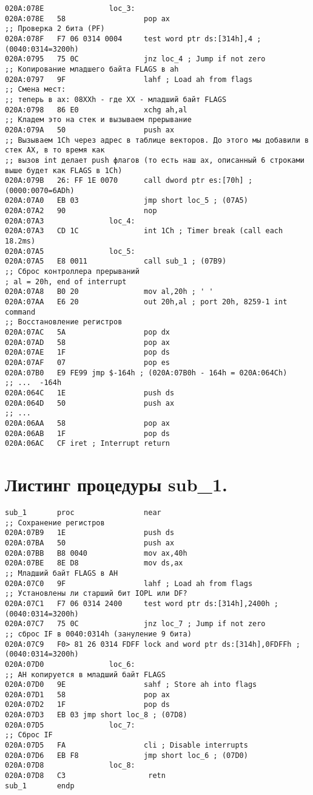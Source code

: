 \begin{lstlisting}[style={asm}]
020A:078E               loc_3:
020A:078E   58                  pop ax
;; Проверка 2 бита (PF)
020A:078F   F7 06 0314 0004     test word ptr ds:[314h],4 ; (0040:0314=3200h)
020A:0795   75 0C               jnz loc_4 ; Jump if not zero
;; Копирование младшего байта FLAGS в ah
020A:0797   9F                  lahf ; Load ah from flags
;; Смена мест: 
;; теперь в ax: 08XXh - где XX - младший байт FLAGS
020A:0798   86 E0               xchg ah,al
;; Кладем это на стек и вызываем прерывание
020A:079A   50                  push ax
;; Вызываем 1Сh через адрес в таблице векторов. До этого мы добавили в стек AX, в то время как
;; вызов int делает push флагов (то есть наш ax, описанный 6 строками выше будет как FLAGS в 1Ch)
020A:079B   26: FF 1E 0070      call dword ptr es:[70h] ; (0000:0070=6ADh)
020A:07A0   EB 03               jmp short loc_5 ; (07A5)
020A:07A2   90                  nop
020A:07A3               loc_4:
020A:07A3   CD 1C               int 1Ch ; Timer break (call each 18.2ms)
020A:07A5               loc_5:
020A:07A5   E8 0011             call sub_1 ; (07B9)
;; Сброс контроллера прерываний
; al = 20h, end of interrupt
020A:07A8   B0 20               mov al,20h ; ' '
020A:07AA   E6 20               out 20h,al ; port 20h, 8259-1 int command
;; Восстановление регистров
020A:07AC   5A                  pop dx
020A:07AD   58                  pop ax
020A:07AE   1F                  pop ds
020A:07AF   07                  pop es
020A:07B0   E9 FE99 jmp $-164h ; (020A:07B0h - 164h = 020A:064Ch)
;; ...  -164h
020A:064C   1E                  push ds
020A:064D   50                  push ax
;; ...
020A:06AA   58                  pop ax
020A:06AB   1F                  pop ds
020A:06AC   CF iret ; Interrupt return
\end{lstlisting}

\pagebreak
\section*{Листинг процедуры sub\_1.}
\begin{lstlisting}[style={asm}]
sub_1       proc                near
;; Сохранение регистров
020A:07B9   1E                  push ds
020A:07BA   50                  push ax
020A:07BB   B8 0040             mov ax,40h
020A:07BE   8E D8               mov ds,ax
;; Младший байт FLAGS в AH
020A:07C0   9F                  lahf ; Load ah from flags
;; Установлены ли старший бит IOPL или DF?
020A:07C1   F7 06 0314 2400     test word ptr ds:[314h],2400h ; (0040:0314=3200h)
020A:07C7   75 0C               jnz loc_7 ; Jump if not zero
;; сброс IF в 0040:0314h (зануление 9 бита)
020A:07C9   F0> 81 26 0314 FDFF lock and word ptr ds:[314h],0FDFFh ; (0040:0314=3200h)
020A:07D0               loc_6:
;; AH копируется в младший байт FLAGS
020A:07D0   9E                  sahf ; Store ah into flags
020A:07D1   58                  pop ax
020A:07D2   1F                  pop ds
020A:07D3   EB 03 jmp short loc_8 ; (07D8)
020A:07D5               loc_7:
;; Сброс IF
020A:07D5   FA                  cli ; Disable interrupts
020A:07D6   EB F8               jmp short loc_6 ; (07D0)
020A:07D8               loc_8:
020A:07D8   C3                   retn
sub_1       endp
\end{lstlisting}
